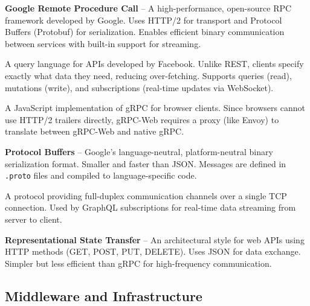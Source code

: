 \documentclass[11pt,letterpaper]{article}
\begin{document}
\begin{description}[style=nextline, leftmargin=2cm]
    \item[gRPC] \textbf{Google Remote Procedure Call} -- A high-performance, open-source RPC framework developed by Google. Uses HTTP/2 for transport and Protocol Buffers (Protobuf) for serialization. Enables efficient binary communication between services with built-in support for streaming.

    \item[GraphQL] A query language for APIs developed by Facebook. Unlike REST, clients specify exactly what data they need, reducing over-fetching. Supports queries (read), mutations (write), and subscriptions (real-time updates via WebSocket).

    \item[gRPC-Web] A JavaScript implementation of gRPC for browser clients. Since browsers cannot use HTTP/2 trailers directly, gRPC-Web requires a proxy (like Envoy) to translate between gRPC-Web and native gRPC.

    \item[Protobuf] \textbf{Protocol Buffers} -- Google's language-neutral, platform-neutral binary serialization format. Smaller and faster than JSON. Messages are defined in \texttt{.proto} files and compiled to language-specific code.

    \item[WebSocket] A protocol providing full-duplex communication channels over a single TCP connection. Used by GraphQL subscriptions for real-time data streaming from server to client.

    \item[REST] \textbf{Representational State Transfer} -- An architectural style for web APIs using HTTP methods (GET, POST, PUT, DELETE). Uses JSON for data exchange. Simpler but less efficient than gRPC for high-frequency communication.
\end{description}

\subsection{Middleware and Infrastructure}
\end{document}
